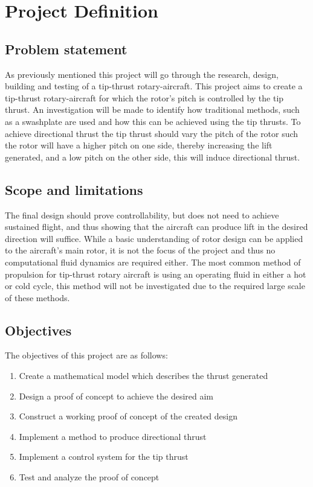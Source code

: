 \chapter{Project Definition}
\section{Problem statement}
    As previously mentioned this project will go through the research, design, building and testing of a tip-thrust rotary-aircraft. This project aims to create a tip-thrust rotary-aircraft for which the rotor's pitch is controlled by the tip thrust. An investigation will be made to identify how traditional methods, such as a swashplate are used and how this can be achieved using the tip thrusts. To achieve directional thrust the tip thrust should vary the pitch of the rotor such the rotor will have a higher pitch on one side, thereby increasing the lift generated, and a low pitch on the other side, this will induce directional thrust.

\section{Scope and limitations}
    The final design should prove controllability, but does not need to achieve sustained flight, and thus showing that the aircraft can produce lift in the desired direction will suffice. While a basic understanding of rotor design can be applied to the aircraft's main rotor, it is not the focus of the project and thus no computational fluid dynamics are required either. The most common method of propulsion for tip-thrust rotary aircraft is using an operating fluid in either a hot or cold cycle, this method will not be investigated due to the required large scale of these methods. 
\section{Objectives}
    The objectives of this project are as follows:
    \begin{enumerate}
        \item Create a mathematical model which describes the thrust generated
        \item Design a proof of concept to achieve the desired aim
        \item Construct a working proof of concept of the created design 
        \item Implement a method to produce directional thrust
        \item Implement a control system for the tip thrust
        \item Test and analyze the proof of concept
    \end{enumerate}
